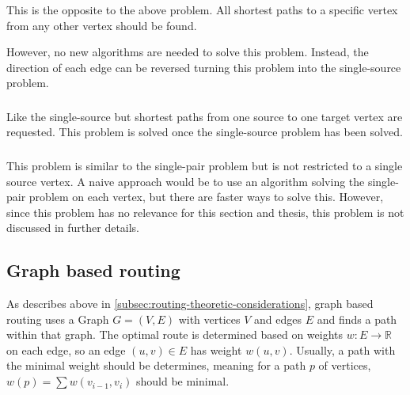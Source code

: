 		
		\subsubsection{}
		
			This is the opposite to the above problem.
			All shortest paths to a specific vertex from any other vertex should be found.
			
			However, no new algorithms are needed to solve this problem.
			Instead, the direction of each edge can be reversed turning this problem into the single-source problem.
		
		\subsubsection{}
		
			Like the single-source but shortest paths from one source to one target vertex are requested.
			This problem is solved once the single-source problem has been solved.
		
		\subsubsection{}
		
			This problem is similar to the single-pair problem but is not restricted to a single source vertex.
			A naive approach would be to use an algorithm solving the single-pair problem on each vertex, but there are faster ways to solve this.
			However, since this problem has no relevance for this section and thesis, this problem is not discussed in further details.

	\subsection{Graph based routing}
		
		As describes above in \cref{subsec:routing-theoretic-considerations}, graph based routing uses a Graph $G=(V, E)$ with vertices $V$ and edges $E$ and finds a path within that graph.
		The optimal route is determined based on weights $w : E \rightarrow \mathbb{R}$ on each edge, so an edge $(u, v) \in E$ has weight $w(u, v)$.
		Usually, a path with the minimal weight should be determines, meaning for a path $p$ of vertices, $w(p) = \sum{w(v_{i-1}, v_i)}$ should be minimal\cite[645]{cormen-introduction-to-alg}.
		
